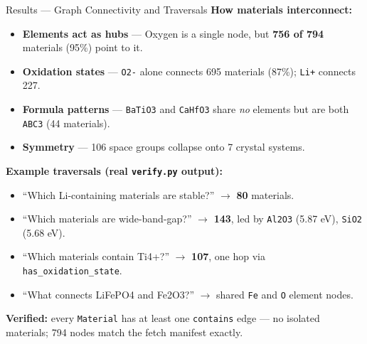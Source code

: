 \documentclass{beamer}
\begin{document}
\begin{frame}{Results --- Graph Connectivity and Traversals}
\textbf{How materials interconnect:}
    \begin{itemize}\small
        \item \textbf{Elements act as hubs} --- Oxygen is a single node, but \textbf{756 of 794} materials (95\%) point to it.
        \item \textbf{Oxidation states} --- \texttt{O2-} alone connects 695 materials (87\%); \texttt{Li+} connects 227.
        \item \textbf{Formula patterns} --- \texttt{BaTiO3} and \texttt{CaHfO3} share \textit{no} elements but are both \texttt{ABC3} (44 materials).
        \item \textbf{Symmetry} --- 106 space groups collapse onto 7 crystal systems.
    \end{itemize}

\vspace{0.2cm}
\textbf{Example traversals (real \texttt{verify.py} output):}
    \begin{itemize}\small
        \item ``Which Li-containing materials are stable?'' $\rightarrow$ \textbf{80} materials.
        \item ``Which materials are wide-band-gap?'' $\rightarrow$ \textbf{143}, led by \texttt{Al2O3} (5.87 eV), \texttt{SiO2} (5.68 eV).
        \item ``Which materials contain Ti4+?'' $\rightarrow$ \textbf{107}, one hop via \texttt{has\_oxidation\_state}.
        \item ``What connects LiFePO4 and Fe2O3?'' $\rightarrow$ shared \texttt{Fe} and \texttt{O} element nodes.
    \end{itemize}

\vspace{0.15cm}
\textbf{Verified:} every \texttt{Material} has at least one \texttt{contains} edge --- no isolated materials; 794 nodes match the fetch manifest exactly.
\end{frame}
\end{document}
